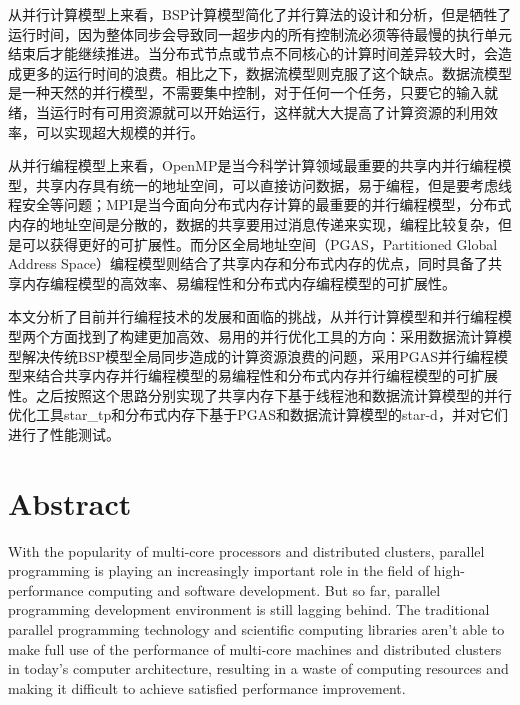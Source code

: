 从并行计算模型上来看，BSP计算模型简化了并行算法的设计和分析，但是牺牲了运行时间，因为整体同步会导致同一超步内的所有控制流必须等待最慢的执行单元结束后才能继续推进。当分布式节点或节点不同核心的计算时间差异较大时，会造成更多的运行时间的浪费。相比之下，数据流模型则克服了这个缺点。数据流模型是一种天然的并行模型，不需要集中控制，对于任何一个任务，只要它的输入就绪，当运行时有可用资源就可以开始运行，这样就大大提高了计算资源的利用效率，可以实现超大规模的并行。

从并行编程模型上来看，OpenMP是当今科学计算领域最重要的共享内并行编程模型，共享内存具有统一的地址空间，可以直接访问数据，易于编程，但是要考虑线程安全等问题；MPI是当今面向分布式内存计算的最重要的并行编程模型，分布式内存的地址空间是分散的，数据的共享要用过消息传递来实现，编程比较复杂，但是可以获得更好的可扩展性。而分区全局地址空间（PGAS，Partitioned Global Address Space）编程模型则结合了共享内存和分布式内存的优点，同时具备了共享内存编程模型的高效率、易编程性和分布式内存编程模型的可扩展性。

本文分析了目前并行编程技术的发展和面临的挑战，从并行计算模型和并行编程模型两个方面找到了构建更加高效、易用的并行优化工具的方向：采用数据流计算模型解决传统BSP模型全局同步造成的计算资源浪费的问题，采用PGAS并行编程模型来结合共享内存并行编程模型的易编程性和分布式内存并行编程模型的可扩展性。之后按照这个思路分别实现了共享内存下基于线程池和数据流计算模型的并行优化工具star\_tp和分布式内存下基于PGAS和数据流计算模型的star-d，并对它们进行了性能测试。

\chapter*{Abstract}

With the popularity of multi-core processors and distributed clusters, parallel programming is playing an increasingly important role in the field of high-performance computing and software development. But so far, parallel programming development environment is still lagging behind. The traditional parallel programming technology and scientific computing libraries aren't able to make full use of the performance of multi-core machines and distributed clusters in today's computer architecture, resulting in a waste of computing resources and making it difficult to achieve satisfied performance improvement.

